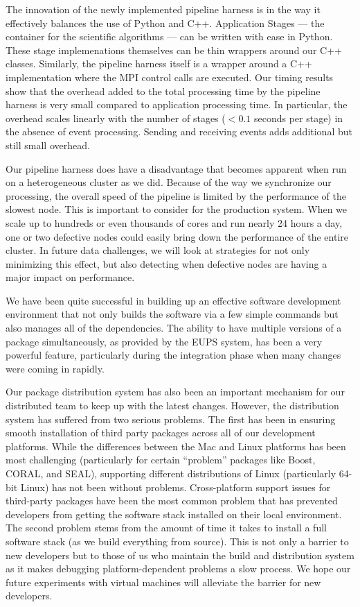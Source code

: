 The innovation of the newly implemented pipeline harness is in the way
it effectively balances the use of Python and C++.  Application
Stages --- the container for the scientific algorithms --- can be written
with ease in Python.  These stage implemenations themselves can be
thin wrappers around our C++ classes.  Similarly, the pipeline harness
itself is a wrapper around a C++ implementation where the MPI control
calls are executed.  Our timing results show that the overhead added to
the total processing time by the pipeline harness is very small
compared to application processing time.  In particular, the overhead
scales linearly with the number of stages ($< 0.1$ seconds per stage) in
the absence of event processing.  Sending and receiving events adds
additional but still small overhead.  

Our pipeline harness does have a disadvantage that becomes apparent
when run on a heterogeneous cluster as we did.  Because of the way we
synchronize our processing, the overall speed of the pipeline is
limited by the performance of the slowest node.  This is important to
consider for the production system.  When we scale up to hundreds or
even thousands of cores and run nearly 24 hours a day, one or two
defective nodes could easily bring down the performance of the entire
cluster.  In future data challenges, we will look at strategies for
not only minimizing this effect, but also detecting when defective
nodes are having a major impact on performance.  

We have been quite successful in building up an effective software
development environment that not only builds the software via a few
simple commands but also manages all of the dependencies.  The ability
to have multiple versions of a package simultaneously, as provided by
the EUPS system, has been a very powerful feature, particularly during
the integration phase when many changes were coming in rapidly.  

Our package distribution system has also been an important mechanism
for our distributed team to keep up with the latest changes.  However,
the distribution system has suffered from two serious problems.  The first
has been in ensuring smooth installation of third party packages
across all of our development platforms.  While the differences
between the Mac and Linux platforms has been most challenging
(particularly for certain ``problem'' packages like Boost, CORAL, and
SEAL), supporting different distributions of Linux (particularly
64-bit Linux) has not been without problems.  Cross-platform support
issues for third-party packages have been the most common problem that
has prevented developers from getting the software stack installed on
their local environment.  The second problem stems from the amount of
time it takes to install a full software stack (as we build everything
from source).  This is not only a barrier to new developers but to
those of us who maintain the build and distribution system as it makes
debugging platform-dependent problems a slow process.  We hope our
future experiments with virtual machines will alleviate the barrier
for new developers.  

